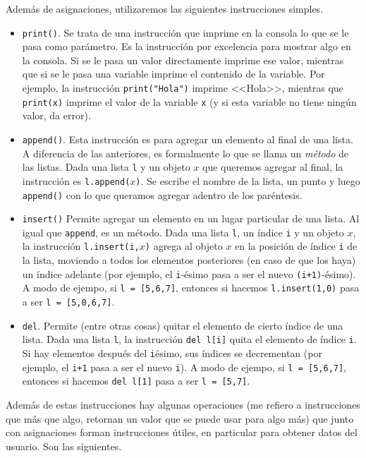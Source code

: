 \documentclass[a4paper, 12pt]{report}
\theoremstyle{definition}
\begin{document}
Además de asignaciones, utilizaremos las siguientes instrucciones simples.
\begin{itemize}
	\item {\tt print()}. Se trata de una instrucción que imprime en la consola lo que se le pasa como parámetro. Es la instrucción por excelencia para mostrar algo en la consola. Si se le pasa un valor directamente imprime ese valor, mientras que si se le pasa una variable imprime el contenido de la variable. Por ejemplo, la instrucción {\tt print("Hola")} imprime <<Hola>>, mientras que {\tt print(x)} imprime el valor de la variable {\tt x} (y si esta variable no tiene ningún valor, da error).
	
	\item {\tt append()}. Esta instrucción es para agregar un elemento al final de una lista. A diferencia de las anteriores, es formalmente lo que se llama un {\sl método} de las listas. Dada una lista {\tt l} y un objeto $x$ que queremos agregar al final, la instrucción es {\tt l.append($x$)}. Se escribe el nombre de la lista, un punto y luego {\tt append()} con lo que queramos agregar adentro de los paréntesis.
	
	\item {\tt insert()} Permite agregar un elemento en un lugar particular de una lista. Al igual que {\tt append}, es un método. Dada una lista {\tt l}, un índice {\tt i} y un objeto $x$, la instrucción {\tt l.insert(i,$x$)} agrega al objeto $x$ en la posición de índice {\tt i} de la lista, moviendo a todos los elementos posteriores (en caso de que los haya) un índice adelante (por ejemplo, el {\tt i}-ésimo pasa a ser el nuevo {\tt(i+1)}-ésimo). A modo de ejempo, si {\tt l = [5,6,7]}, entonces si hacemos {\tt l.insert(1,0)} pasa a ser {\tt l = [5,0,6,7]}.
	
	\item {\tt del}. Permite (entre otras cosas) quitar el elemento de cierto índice de una lista. Dada una lista {\tt l}, la instrucción {\tt del l[i]} quita el elemento de índice {\tt i}. Si hay elementos después del {\tt i}ésimo, sus índices se decrementan (por ejemplo, el {\tt i+1} pasa a ser el nuevo {\tt i}). A modo de ejempo, si {\tt l = [5,6,7]}, entonces si hacemos {\tt del~l[1]} pasa a ser {\tt l = [5,7]}.
\end{itemize}

Además de estas instrucciones hay algunas operaciones (me refiero a instrucciones que más que algo, retornan un valor que se puede usar para algo más) que junto con asignaciones forman instrucciones útiles, en particular para obtener datos del usuario. Son las siguientes.
\end{document}

